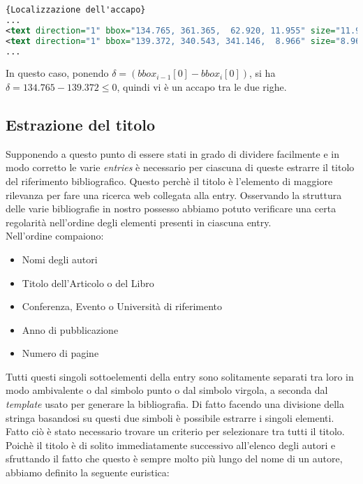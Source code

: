 \begin{lstlisting}[language=XML,frame=r,caption=\textit{Esempio di XML in cui si nota l'accapo tra References e la prima voce} ,breaklines=true,basicstyle=\small]{Localizzazione dell'accapo}
...
<text direction="1" bbox="134.765, 361.365,  62.920, 11.955" size="11.955">References</text>
<text direction="1" bbox="139.372, 340.543, 341.146,  8.966" size="8.966">1. J.-F. Arias, C.P. Lai, S. Surya, R. Kasturi, and A.K. Chhabra. Interpretation of</text>
...

\end{lstlisting}

In questo caso, ponendo $ \delta  =   (bbox_{i-1}[0] - bbox_{i}[0] ) $, si ha $ \delta  = 134.765 - 139.372 \leq 0$, quindi vi è un accapo tra le due righe.



\subsection{Estrazione del titolo}
Supponendo a questo punto di essere stati in grado di dividere facilmente e in modo corretto le varie \textit{entries} è necessario per ciascuna di queste estrarre il titolo del riferimento bibliografico. Questo perchè il titolo è l'elemento di maggiore rilevanza per fare una ricerca web collegata alla entry. Osservando la struttura delle varie bibliografie in nostro possesso abbiamo potuto verificare una certa regolarità nell'ordine degli elementi presenti in ciascuna entry.
\\
Nell'ordine compaiono:
\begin{itemize}
 \item Nomi degli autori
 \item Titolo dell'Articolo o del Libro
 \item Conferenza, Evento o Università di riferimento
 \item Anno di pubblicazione
 \item Numero di pagine
\end{itemize}

Tutti questi singoli sottoelementi della entry sono solitamente separati tra loro in modo ambivalente o dal simbolo punto o dal simbolo virgola, a seconda dal \textit{template} usato per generare la bibliografia. Di fatto facendo una divisione della stringa basandosi su questi due simboli è possibile estrarre i singoli elementi. Fatto ciò è stato necessario trovare un criterio per selezionare tra tutti il titolo.
Poichè il titolo è di solito immediatamente successivo all'elenco degli autori e sfruttando il fatto che questo è sempre molto più lungo del nome di un autore, abbiamo definito la seguente euristica:\\


